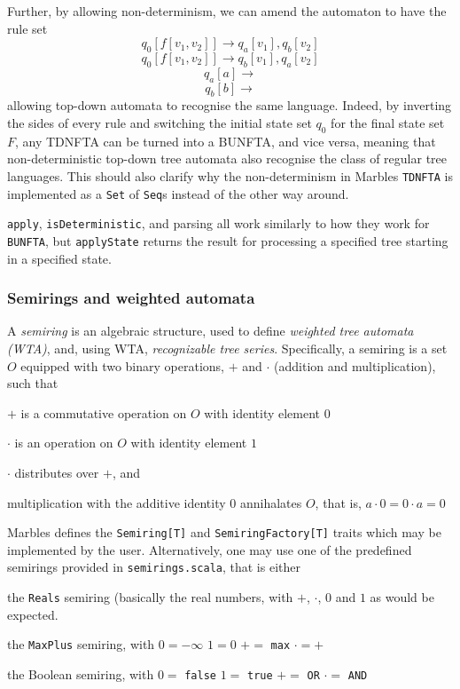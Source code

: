 Further, by allowing non-determinism, we can amend the automaton to have
the rule set
$$q_0[f[v_1,v_2]] \rightarrow q_a[v_1], q_b[v_2]$$
$$q_0[f[v_1,v_2]] \rightarrow q_b[v_1], q_a[v_2]$$
$$q_a[a] \rightarrow $$
$$q_b[b] \rightarrow $$
allowing top-down automata to recognise the same language. Indeed, by
inverting the sides of every rule and switching the initial state set $q_0$
for the final state set $F$, any TDNFTA can be turned into a BUNFTA, and
vice versa, meaning that non-deterministic top-down tree automata also
recognise the class of regular tree languages. This should also clarify why
the non-determinism in Marbles \texttt{TDNFTA} is implemented as a
\texttt{Set} of \texttt{Seq}s instead of the other way around.

\texttt{apply}, \texttt{isDeterministic}, and parsing all work similarly to
how they work for \texttt{BUNFTA}, but \texttt{applyState} returns the
result for processing a specified tree starting in a specified state. 

\subsubsection{Semirings and weighted automata}

A \emph{semiring} is an algebraic structure, used to define \emph{weighted
tree automata (WTA)}, and, using WTA, \emph{recognizable tree series}.
Specifically, a semiring is a set $O$ equipped with two binary operations,
$+$ and $\cdot$ (addition and multiplication), such that
\begin{compactitem}
\item $+$ is a commutative operation on $O$ with identity element $0$
\item $\cdot$ is an operation on $O$ with identity element $1$
\item $\cdot$ distributes over $+$, and
\item multiplication with the additive identity $0$ annihalates $O$, that
is, $a \cdot 0 = 0 \cdot a = 0$
\end{compactitem}

Marbles defines the \texttt{Semiring[T]} and \texttt{SemiringFactory[T]}
traits which may be implemented by the user. Alternatively, one may use one
of the predefined semirings provided in \texttt{semirings.scala}, that is
either
\begin{compactitem}
\item the \texttt{Reals} semiring (basically the real numbers, with $+$, $\cdot$, $0$ and $1$ as would be expected.
\item the \texttt{MaxPlus} semiring, with
\subitem $0 = -\infty$
\subitem $1 = 0$ 
\subitem $+=$ \texttt{max}
\subitem $\cdot=+$
\item the Boolean semiring, with
\subitem $0 =$ \texttt{false}
\subitem $1 =$ \texttt{true}
\subitem $+=$ \texttt{OR}
\subitem $\cdot=$ \texttt{AND}
\end{compactitem}

